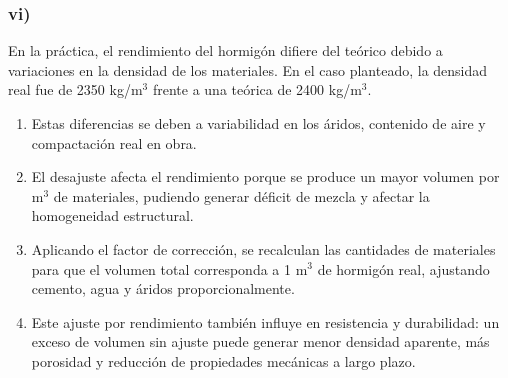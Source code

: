 \subsubsection*{vi)}

En la práctica, el rendimiento del hormigón difiere del teórico debido a variaciones en la densidad de los materiales. En el caso planteado, la densidad real fue de 2350 kg/m\(^3\) frente a una teórica de 2400 kg/m\(^3\).
\begin{enumerate}
    \item Estas diferencias se deben a variabilidad en los áridos, contenido de aire y compactación real en obra.
    \item El desajuste afecta el rendimiento porque se produce un mayor volumen por m\(^3\) de materiales, pudiendo generar déficit de mezcla y afectar la homogeneidad estructural.
    \item Aplicando el factor de corrección, se recalculan las cantidades de materiales para que el volumen total corresponda a 1 m\(^3\) de hormigón real, ajustando cemento, agua y áridos proporcionalmente.
    \item Este ajuste por rendimiento también influye en resistencia y durabilidad: un exceso de volumen sin ajuste puede generar menor densidad aparente, más porosidad y reducción de propiedades mecánicas a largo plazo.
\end{enumerate}
